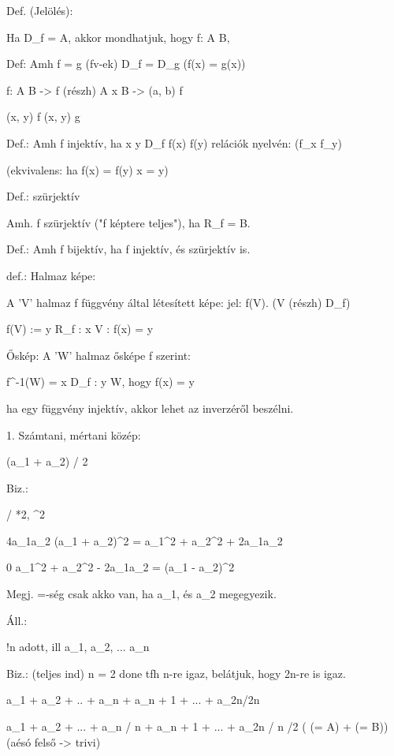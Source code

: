 Def. (Jelölés):

Ha D_f = A, akkor mondhatjuk, hogy f: A \rightarrow B,


Def:
Amh f = g (fv-ek) \iff D_f = D_g (f(x) = g(x))

f: A \rightarrow B -> f (részh) A x B -> (a, b) \in f

(x, y) \in f \iff (x, y) \in g

Def.:
Amh f injektív, ha x \neq y \in D_f \Rightarrow f(x) \neq f(y)
relációk nyelvén: (f_x \neq f_y)

(ekvivalens: ha f(x) = f(y) \Rightarrow x = y)

Def.:
szürjektív

Amh. f szürjektív ("f képtere teljes"), ha R_f = B.

Def.:
Amh f bijektív, ha f injektív, és szürjektív is.

def.:
Halmaz képe:

A 'V' halmaz f függvény által létesített képe:
jel: f(V).  (V (részh) D_f)

f(V) := {y \in R_f : \exists x \in V : f(x) = y }


Őskép:
A 'W' halmaz ősképe f szerint:

f^{-1}(W) = {x \in D_f : \exists y \in W, hogy f(x) = y}

ha egy függvény injektív, akkor lehet az inverzéről beszélni.


1. Számtani, mértani közép:

 \leq (a_1 + a_2) / 2

Biz.:

/ *2, ^2

4a_1a_2 \leq (a_1 + a_2)^2 = a_1^2 + a_2^2 + 2a_1a_2

0 \leq a_1^2 + a_2^2 - 2a_1a_2 = (a_1 - a_2)^2

Megj. =-ség csak akko van, ha a_1, és a_2 megegyezik.

Áll.:

!n \in {} adott, ill a_1, a_2, ... a_n  \Rightarrow {} \leq {}

Biz.: (teljes ind)
n = 2 done
tfh n-re igaz, belátjuk, hogy 2n-re is igaz.

{a_1 + a_2 + .. + a_n + a_{n + 1} + ... + a_{2n}}/2n \geq {}

a_1 + a_2 + ... + a_n / n + a_{n + 1} + ... + a_{2n} / n /2 ( (= A) +  (= B))  (aésó \geq felső -> trivi)

